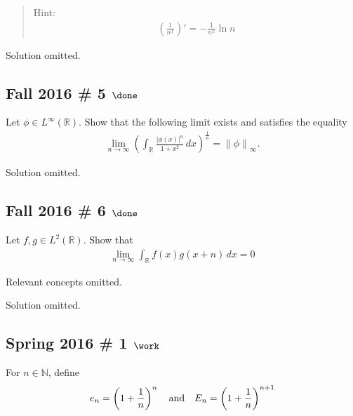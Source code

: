 \begin{quote}
Hint:
\begin{align*}
\left(\frac{1}{n^{x}}\right)' = -\frac{1}{n^{x}} \ln n
\end{align*}
\end{quote}


Solution omitted.

\hypertarget{fall-2016-5-done}{%
\subsection{\texorpdfstring{Fall 2016 \# 5
\(\done\)}{Fall 2016 \# 5 \textbackslash done}}\label{fall-2016-5-done}}

Let \(\phi\in L^\infty({\mathbb{R}})\). Show that the following limit
exists and satisfies the equality
\begin{align*}
\lim _{n \to \infty} \left(\int _{\mathbb{R}} \frac{|\phi(x)|^{n}}{1+x^{2}} \, dx \right) ^ {\frac{1}{n}} 
= {\left\lVert {\phi} \right\rVert}_\infty.
\end{align*}

Solution omitted.

\hypertarget{fall-2016-6-done}{%
\subsection{\texorpdfstring{Fall 2016 \# 6
\(\done\)}{Fall 2016 \# 6 \textbackslash done}}\label{fall-2016-6-done}}

Let \(f, g \in L^2({\mathbb{R}})\). Show that
\begin{align*}
\lim _{n \to \infty} \int _{{\mathbb{R}}} f(x) g(x+n) \,dx = 0
\end{align*}


Relevant concepts omitted.

Solution omitted.

\hypertarget{spring-2016-1-work}{%
\subsection{\texorpdfstring{Spring 2016 \# 1
\(\work\)}{Spring 2016 \# 1 \textbackslash work}}\label{spring-2016-1-work}}

For \(n\in {\mathbb{N}}\), define
\begin{align*}
e_{n} = \left (1+ {1\over n} \right)^{n} 
{\quad \operatorname{and} \quad}
E_{n} = \left( 1+ {1\over n} \right)^{n+1}
\end{align*}

